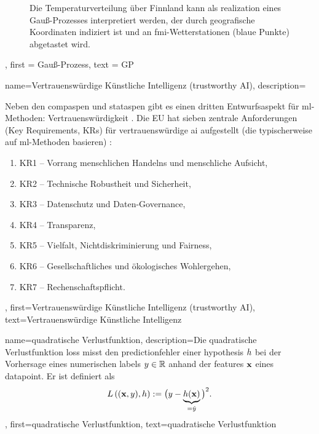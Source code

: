 {{{{{\begin{figure}[H]
\begin{center}
				\vspace*{-15mm}
			\end{center}
			\caption{Die Temperaturverteilung über Finnland kann als \gls{realization} 
				eines Gauß-Prozesses interpretiert werden, der durch geografische Koordinaten indiziert ist und an \gls{fmi}-Wetterstationen (blaue Punkte) abgetastet wird. \label{fig_gp_FMI}}
	\end{figure}},
	first = {Gauß-Prozess},
	text = {GP}
}

	
{name={Vertrauenswürdige Künstliche Intelligenz (trustworthy AI)},
	description={Neben den \gls{compasp}en und \gls{statasp}en gibt es einen dritten 
		Entwurfsaspekt für \gls{ml}-Methoden: Vertrauenswürdigkeit 
		\cite{pfau2024engineeringtrustworthyaideveloper}. 
		Die EU hat sieben zentrale Anforderungen (Key Requirements, KRs) für 
		vertrauenswürdige \gls{ai} aufgestellt (die typischerweise auf \gls{ml}-Methoden basieren)
		\cite{ALTAIEU}:
		\begin{enumerate}[label=\arabic*)]
			\item KR1 – Vorrang menschlichen Handelns und menschliche Aufsicht,
			\item KR2 – Technische Robustheit und Sicherheit,
			\item KR3 – Datenschutz und Daten-Governance,
			\item KR4 – Transparenz,
			\item KR5 – Vielfalt, Nichtdiskriminierung und Fairness,
			\item KR6 – Gesellschaftliches und ökologisches Wohlergehen,
			\item KR7 – Rechenschaftspflicht.
		\end{enumerate}
	},
	first={Vertrauenswürdige Künstliche Intelligenz (trustworthy AI)},
	text={Vertrauenswürdige Künstliche Intelligenz}
}
	
{name={quadratische Verlustfunktion},
	description={Die quadratische Verlustfunktion  \gls{loss} 
		misst den \gls{prediction}fehler einer \gls{hypothesis} $h$ 
		bei der Vorhersage eines numerischen \gls{label}s $y \in \mathbb{R}$ 
		anhand der \gls{feature}s ${\bf x}$ eines \gls{datapoint}. Er ist definiert als
		\begin{equation} 
			\nonumber
			L\left(({\bf x},y),h \right) := \big(y - \underbrace{h({\bf x})}_{=\hat{y}} \big)^{2}. 
		\end{equation}
	},
	first={quadratische Verlustfunktion},
	text={quadratische Verlustfunktion}
}


}}}
